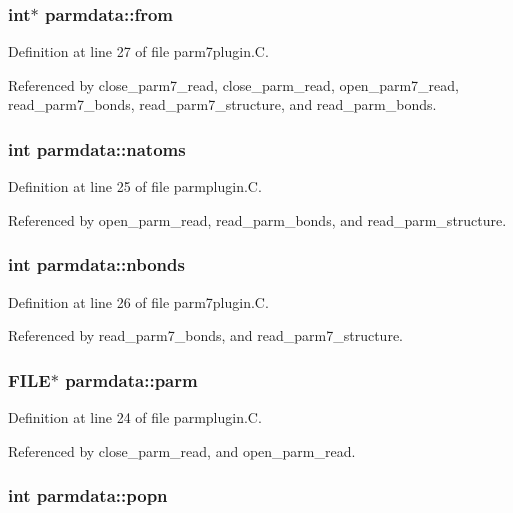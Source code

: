 \subsubsection{\setlength{\rightskip}{0pt plus 5cm}int$\ast$ parmdata::from}\label{structparmdata_m4}




Definition at line 27 of file parm7plugin.C.

Referenced by close\_\-parm7\_\-read, close\_\-parm\_\-read, open\_\-parm7\_\-read, read\_\-parm7\_\-bonds, read\_\-parm7\_\-structure, and read\_\-parm\_\-bonds.
\subsubsection{\setlength{\rightskip}{0pt plus 5cm}int parmdata::natoms}\label{structparmdata_m8}




Definition at line 25 of file parmplugin.C.

Referenced by open\_\-parm\_\-read, read\_\-parm\_\-bonds, and read\_\-parm\_\-structure.
\subsubsection{\setlength{\rightskip}{0pt plus 5cm}int parmdata::nbonds}\label{structparmdata_m3}




Definition at line 26 of file parm7plugin.C.

Referenced by read\_\-parm7\_\-bonds, and read\_\-parm7\_\-structure.
\subsubsection{\setlength{\rightskip}{0pt plus 5cm}FILE$\ast$ parmdata::parm}\label{structparmdata_m7}




Definition at line 24 of file parmplugin.C.

Referenced by close\_\-parm\_\-read, and open\_\-parm\_\-read.
\subsubsection{\setlength{\rightskip}{0pt plus 5cm}int parmdata::popn}\label{structparmdata_m1}




